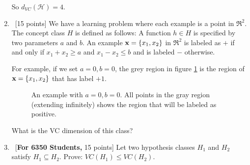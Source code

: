 \begin{enumerate}
So $d_{VC}(\mathcal{H}) = 4$.

\item ~[15 points] We have a learning problem where each example is a
  point in $\Re^2$. The concept class $H$ is defined as follows: A
  function $h \in H$ is specified by two parameters $a$ and $b$. An
  example ${\bf x} = \{x_1, x_2\}$ in $\Re^2$ is labeled as $+$ if and
  only if $x_1 + x_2 \geq a$ and $x_1 - x_2 \leq b$ and is labeled $-$
  otherwise.

  For example, if we set $a = 0, b = 0$, the grey region in figure
  \ref{f1} is the region of ${\bf x} = \{x_1, x_2\}$ that has label
  $+1$.

  \begin{figure}[h!]
    \centering
    \caption{An example with $a = 0, b = 0$. All points in the gray region
      (extending infinitely) shows the region that will be labeled as
      positive.} \label{f1}
  \end{figure}



  What is the VC dimension of this class?


\item ~[{\bf For 6350 Students,} 15 points] Let two hypothesis classes
  $H_1$ and $H_2$ satisfy $H_1 \subseteq H_2$. Prove: $VC(H_1) \leq
  VC(H_2)$.

\end{enumerate}
